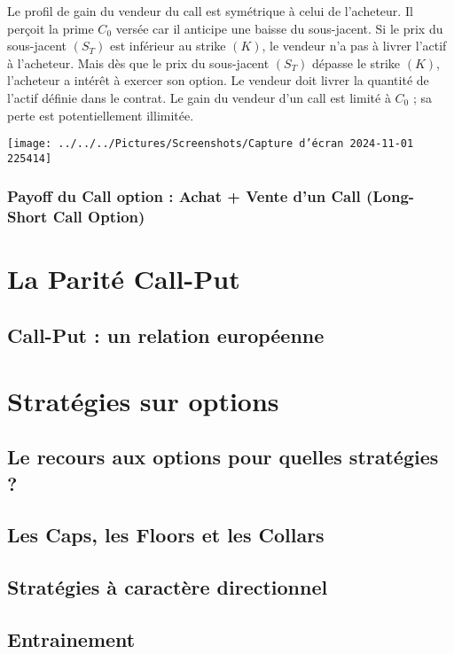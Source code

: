 \documentclass[a4paper, 12pt]{report}
\begin{document}
Le profil de gain du vendeur du call est symétrique à celui de l’acheteur. Il perçoit la prime \( C_0 \) versée car il anticipe une baisse du sous-jacent. Si le prix du sous-jacent \( (S_T) \) est inférieur au strike \( (K) \), le vendeur n’a pas à livrer l’actif à l’acheteur. Mais dès que le prix du sous-jacent \( (S_T) \) dépasse le strike \( (K) \), l’acheteur a intérêt à exercer son option. Le vendeur doit livrer la quantité de l’actif définie dans le contrat. Le gain du vendeur d’un call est limité à \( C_0 \) ; sa perte est potentiellement illimitée.

\texttt{[image: ../../../Pictures/Screenshots/Capture d'écran 2024-11-01 225414]}


\subsubsection{Payoff du Call option : Achat + Vente d’un Call (Long-Short Call Option)}

\section{La Parité Call-Put}

\subsection{Call-Put : un relation européenne}

\section{Stratégies sur options}

\subsection{Le recours aux options pour quelles stratégies ?}

\subsection{Les Caps, les Floors et les Collars}

\subsection{Stratégies à caractère directionnel}

\subsection{Entrainement}
\end{document}
